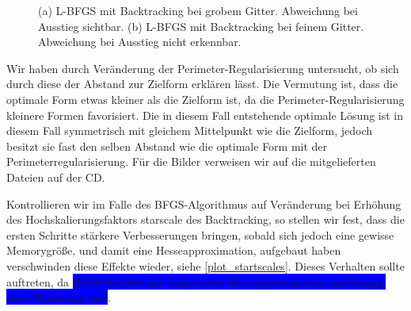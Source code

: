 \begin{figure}
\begin{subfigure}{0.5\textwidth}
	\caption{}	
	\end{subfigure}
\caption{(a) L-BFGS mit Backtracking bei grobem Gitter. Abweichung bei Ausstieg sichtbar. (b) L-BFGS mit Backtracking bei feinem Gitter. Abweichung bei Ausstieg nicht erkennbar.}
\label{Konvergenzbfgscircle}
\end{figure}

Wir haben durch Veränderung der Perimeter-Regularisierung untersucht, ob sich durch diese der Abstand zur Zielform erklären lässt. Die Vermutung ist, dass die optimale Form etwas kleiner als die Zielform ist, da die Perimeter-Regularisierung kleinere Formen favorisiert. Die in diesem Fall entstehende optimale Lösung ist in diesem Fall symmetrisch mit gleichem Mittelpunkt wie die Zielform, jedoch besitzt sie fast den selben Abstand wie die optimale Form mit der Perimeterregularisierung. Für die Bilder verweisen wir auf die mitgelieferten Dateien auf der CD.

Kontrollieren wir im Falle des BFGS-Algorithmus auf Veränderung bei Erhöhung des Hochskalierungsfaktors \textsf{starscale} des Backtracking, so stellen wir fest, dass die ersten Schritte stärkere Verbesserungen bringen, sobald sich jedoch eine gewisse Memorygröße, und damit eine Hesseapproximation, aufgebaut haben verschwinden diese Effekte wieder, siehe \ref{plot_startscales}. Dieses Verhalten sollte auftreten, da \colorbox{blue}{BFGS-Schritte mit aufgebauter Hesseapproximation unabhängig einer Skalierung sind}.

